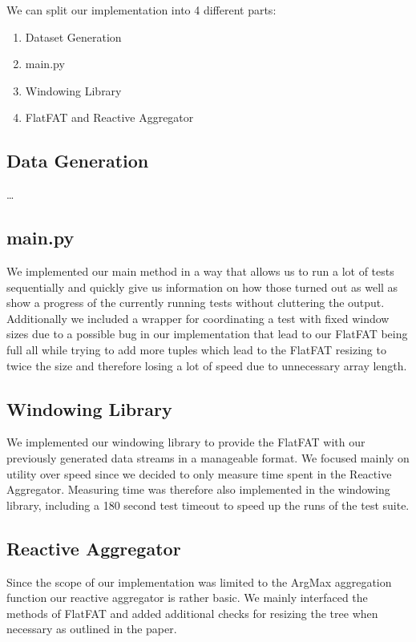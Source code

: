 We can split our implementation into 4 different parts:
\begin{enumerate}
  \item Dataset Generation
  \item main.py
  \item Windowing Library
  \item FlatFAT and Reactive Aggregator
\end{enumerate}

\subsection{Data Generation}

\ldots

\subsection{main.py}
We implemented our main method in a way that allows us to run a lot of tests sequentially
and quickly give us information on how those turned out as well as show a progress of the
currently running tests without cluttering the output.
Additionally we included a wrapper for coordinating a test with fixed window sizes due
to a possible bug in our implementation that lead to our FlatFAT being full all while trying
to add more tuples which lead to the FlatFAT resizing to twice the size and therefore
losing a lot of speed due to unnecessary array length.

\subsection{Windowing Library}
We implemented our windowing library to provide the FlatFAT with our previously generated
data streams in a manageable format. We focused mainly on utility over speed since we
decided to only measure time spent in the Reactive Aggregator.
Measuring time was therefore also implemented in the windowing library, including a
180 second test timeout to speed up the runs of the test suite.

\subsection{Reactive Aggregator}
Since the scope of our implementation was limited to the ArgMax aggregation function
our reactive aggregator is rather basic. We mainly interfaced the methods of FlatFAT
and added additional checks for resizing the tree when necessary as outlined in the paper.

